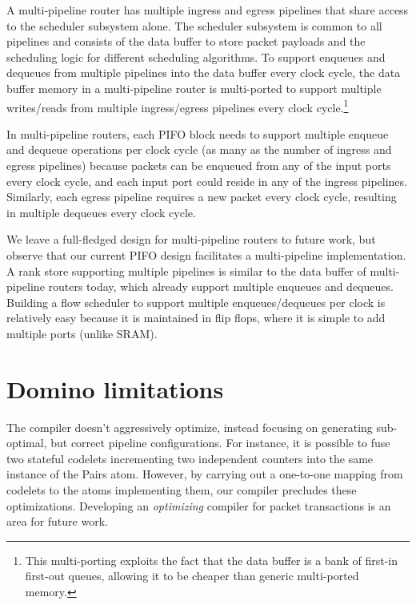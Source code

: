  A multi-pipeline router has multiple ingress and egress pipelines
that share access to the scheduler subsystem alone. The scheduler subsystem is
common to all pipelines and consists of the data buffer to store packet
payloads and the scheduling logic for different scheduling algorithms. To
support enqueues and dequeues from multiple pipelines into the data buffer
every clock cycle, the data buffer memory in a multi-pipeline router is
multi-ported to support multiple writes/reads from multiple ingress/egress
pipelines every clock cycle.\footnote{This multi-porting exploits the fact that
the data buffer is a bank of first-in first-out queues, allowing it to be
cheaper than generic multi-ported memory.}

In multi-pipeline routers, each PIFO block needs to support multiple enqueue
and dequeue operations per clock cycle (as many as the number of ingress and
egress pipelines) because packets can be enqueued from any of the input ports
every clock cycle, and each input port could reside in any of the ingress
pipelines. Similarly, each egress pipeline requires a new packet every clock
cycle, resulting in multiple dequeues every clock cycle.

We leave a full-fledged design for multi-pipeline routers to future work, but
observe that our current PIFO design facilitates a multi-pipeline
implementation.  A rank store supporting multiple pipelines is similar to the
data buffer of multi-pipeline routers today, which already support multiple
enqueues and dequeues. Building a flow scheduler to support multiple
enqueues/dequeues per clock is relatively easy because it is maintained in flip
flops, where it is simple to add multiple ports (unlike SRAM).

\section{Domino limitations}
\label{sec:domino_limitations}
The \pktlanguage compiler doesn't aggressively optimize, instead focusing on
generating sub-optimal, but correct pipeline configurations. For instance, it is
possible to fuse two stateful codelets incrementing two independent counters
into the same instance of the Pairs atom. However, by carrying out a one-to-one
mapping from codelets to the atoms implementing them, our compiler precludes
these optimizations.  Developing an {\em optimizing} compiler for packet
transactions is an area for future work.

